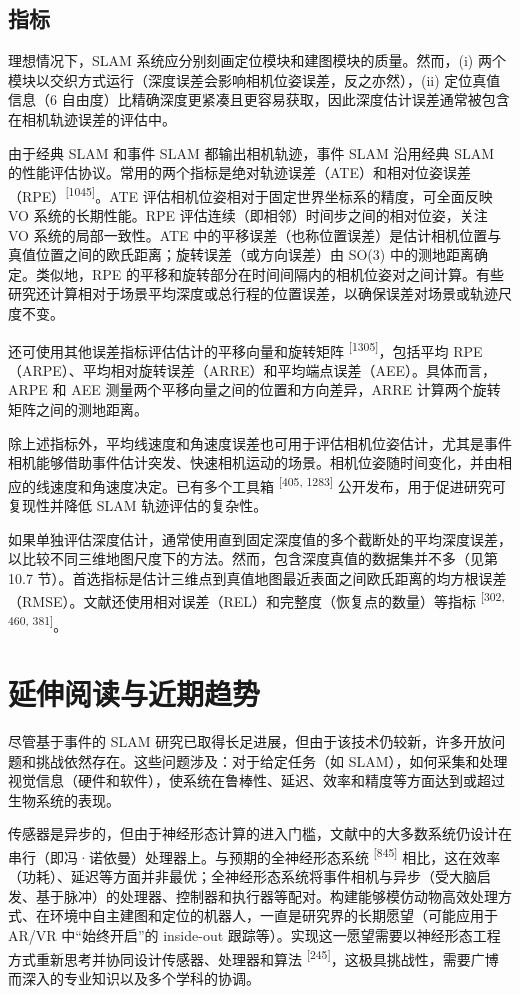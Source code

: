 \subsection{指标}

理想情况下，SLAM 系统应分别刻画定位模块和建图模块的质量。然而，(i) 两个模块以交织方式运行（深度误差会影响相机位姿误差，反之亦然），(ii) 定位真值信息（6 自由度）比精确深度更紧凑且更容易获取，因此深度估计误差通常被包含在相机轨迹误差的评估中。

由于经典 SLAM 和事件 SLAM 都输出相机轨迹，事件 SLAM 沿用经典 SLAM 的性能评估协议。常用的两个指标是绝对轨迹误差（ATE）和相对位姿误差（RPE）\textsuperscript{[1045]}。ATE 评估相机位姿相对于固定世界坐标系的精度，可全面反映 VO 系统的长期性能。RPE 评估连续（即相邻）时间步之间的相对位姿，关注 VO 系统的局部一致性。ATE 中的平移误差（也称位置误差）是估计相机位置与真值位置之间的欧氏距离；旋转误差（或方向误差）由 SO(3) 中的测地距离确定。类似地，RPE 的平移和旋转部分在时间间隔内的相机位姿对之间计算。有些研究还计算相对于场景平均深度或总行程的位置误差，以确保误差对场景或轨迹尺度不变。

还可使用其他误差指标评估估计的平移向量和旋转矩阵 \textsuperscript{[1305]}，包括平均 RPE（ARPE）、平均相对旋转误差（ARRE）和平均端点误差（AEE）。具体而言，ARPE 和 AEE 测量两个平移向量之间的位置和方向差异，ARRE 计算两个旋转矩阵之间的测地距离。

除上述指标外，平均线速度和角速度误差也可用于评估相机位姿估计，尤其是事件相机能够借助事件估计突发、快速相机运动的场景。相机位姿随时间变化，并由相应的线速度和角速度决定。已有多个工具箱 \textsuperscript{[405, 1283]} 公开发布，用于促进研究可复现性并降低 SLAM 轨迹评估的复杂性。

如果单独评估深度估计，通常使用直到固定深度值的多个截断处的平均深度误差，以比较不同三维地图尺度下的方法。然而，包含深度真值的数据集并不多（见第 10.7 节）。首选指标是估计三维点到真值地图最近表面之间欧氏距离的均方根误差（RMSE）。文献还使用相对误差（REL）和完整度（恢复点的数量）等指标 \textsuperscript{[302, 460, 381]}。

\section{延伸阅读与近期趋势}

尽管基于事件的 SLAM 研究已取得长足进展，但由于该技术仍较新，许多开放问题和挑战依然存在。这些问题涉及：对于给定任务（如 SLAM），如何采集和处理视觉信息（硬件和软件），使系统在鲁棒性、延迟、效率和精度等方面达到或超过生物系统的表现。

传感器是异步的，但由于神经形态计算的进入门槛，文献中的大多数系统仍设计在串行（即冯·诺依曼）处理器上。与预期的全神经形态系统 \textsuperscript{[845]} 相比，这在效率（功耗）、延迟等方面并非最优；全神经形态系统将事件相机与异步（受大脑启发、基于脉冲）的处理器、控制器和执行器等配对。构建能够模仿动物高效处理方式、在环境中自主建图和定位的机器人，一直是研究界的长期愿望（可能应用于 AR/VR 中“始终开启”的 inside-out 跟踪等）。实现这一愿望需要以神经形态工程方式重新思考并协同设计传感器、处理器和算法 \textsuperscript{[245]}，这极具挑战性，需要广博而深入的专业知识以及多个学科的协调。

